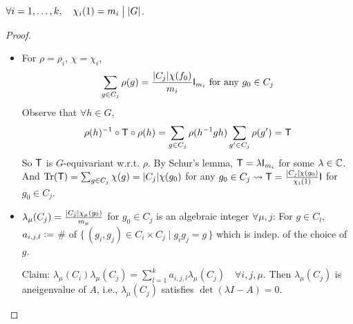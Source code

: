 \begin{theorem}[Divisibility]
  $\forall i = 1, \dots, k, \quad \chi_i(1) = m_i \mathrel{\big|} \lvert G\rvert$.

  \begin{proof} \mbox{}
    \begin{itemize}
      \item For $\rho=\rho_i$, $\chi = \chi_i$,
        \[
          \sum_{g\in C_j} \rho(g) = \frac{\lvert C_j\rvert\chi(f_0)}{m_i}
          {\sf I}_{m_i} \text{~for any~} g_0 \in C_j
        \]
        Observe that $\forall h \in G$,
        \[
          \rho(h)^{-1}\circ{\sf T}\circ\rho(h) = \sum_{g\in C_j} \rho(h^{-1}gh)
          \sum_{g'\in C_j} \rho(g') = {\sf T}
        \]
        So ${\sf T}$ is $G$-equivariant w.r.t. $\rho$.
        By Schur's lemma, ${\sf T} = \lambda {\sf I}_{m_i}$ for some $\lambda \in \mathbb{C}$.
        And $\operatorname{Tr}({\sf T}) = \sum_{g\in C_j} \chi(g) = \lvert C_j\rvert\chi(g_0)$
        for any $g_0 \in C_j \leadsto {\sf T} =
        \frac{\lvert C_j\rvert\chi(g_0)}{\chi_i(1)} {\sf I}$ for $g_0 \in C_j$.
      \item $\lambda_\mu(C_j) = \frac{\lvert C_j\rvert\chi_\mu(g_0)}{m_\mu}$ for
        $g_0 \in C_j$ is an algebraic integer $\forall \mu, j$:
        For $g\in C_l$, $a_{i,j,l} \vcentcolon=$ \# of $\{\, (g_i, g_j) \in C_i \times C_j \mid
        g_ig_j = g \,\}$ which is indep. of the choice of $g$.

        Claim: $\lambda_\mu(C_i)\lambda_\mu(C_j) = \sum_{l=1}^k a_{i,j,l} \lambda_\mu(C_j)
        \quad \forall i, j, \mu$. Then $\lambda_\mu(C_j)$ is aneigenvalue of
        $A$, i.e., $\lambda_\mu(C_j)$ satisfies $\det(\lambda I - A) = 0$.


\end{itemize}
\end{proof}
\end{theorem}
